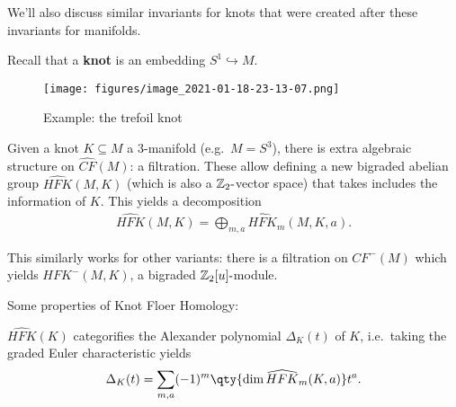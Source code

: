 We'll also discuss similar invariants for knots that were created after
these invariants for manifolds.

\begin{definition}[Knots]

Recall that a \textbf{knot} is an embedding \(S^1 \hookrightarrow M\).

\begin{figure}
\centering
\texttt{[image: figures/image\_2021-01-18-23-13-07.png]}
\caption{Example: the trefoil knot}
\end{figure}

\end{definition}

\begin{proposition}

Given a knot \(K \subseteq M\) a 3-manifold (e.g.~\(M = S^3\)), there is
extra algebraic structure on \(\widehat{CF}(M)\): a filtration. These
allow defining a new bigraded abelian group \(\widehat{HFK}(M, K)\)
(which is also a \({\mathbb{Z}}_2{\hbox{-}}\)vector space) that takes
includes the information of \(K\). This yields a decomposition
\begin{align*}
\widehat{HFK}(M, K) = \bigoplus _{m, a} \widehat{HFK}_m(M, K, a)
.\end{align*}

This similarly works for other variants: there is a filtration on
\(CF^-(M)\) which yields \(HFK^-(M, K)\), a bigraded
\({\mathbb{Z}}_2[u]{\hbox{-}}\)module.

\end{proposition}

Some properties of Knot Floer Homology:

\begin{fact}

\(\widehat{HFK}(K)\) categorifies the Alexander polynomial
\(\Delta_K(t)\) of \(K\), i.e.~taking the graded Euler characteristic
yields
\begin{align*}
\Delta_K (t) =\sum_{m, a} (-1)^m\qty{ \dim \widehat{HFK}_m(K, a) } t^a
.\end{align*}

\end{fact}

